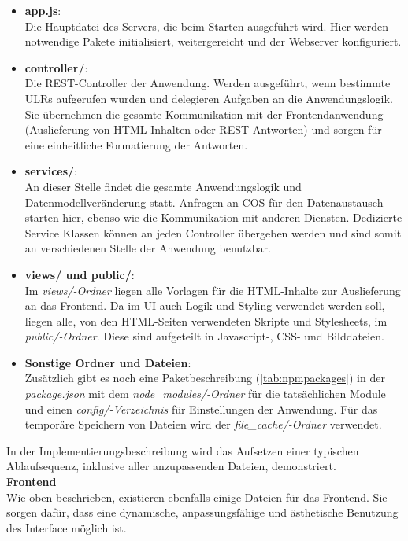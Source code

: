 \begin{itemize}
	\item \textbf{app.js}:\\
	Die Hauptdatei des Servers, die beim Starten ausgeführt wird. Hier werden notwendige Pakete initialisiert, weitergereicht und der Webserver konfiguriert.
	\item \textbf{controller/}:\\
	Die REST-Controller der Anwendung. Werden ausgeführt, wenn bestimmte ULRs aufgerufen wurden und delegieren Aufgaben an die Anwendungslogik. Sie übernehmen die gesamte Kommunikation mit der Frontendanwendung (Auslieferung von HTML-Inhalten oder REST-Antworten) und sorgen für eine einheitliche Formatierung der Antworten.
	\item \textbf{services/}:\\
	An dieser Stelle findet die gesamte Anwendungslogik und Datenmodellveränderung statt. Anfragen an \ac{COS} für den Datenaustausch starten hier, ebenso wie die Kommunikation mit anderen Diensten.
	Dedizierte Service Klassen können an jeden Controller übergeben werden und sind somit an verschiedenen Stelle der Anwendung benutzbar.
	\item \textbf{views/ und public/}:\\
	Im \textit{views/-Ordner} liegen alle Vorlagen für die HTML-Inhalte zur Auslieferung an das Frontend. Da im \ac{UI} auch Logik und Styling verwendet werden soll, liegen alle, von den HTML-Seiten verwendeten Skripte und Stylesheets, im \textit{public/-Ordner}.
	Diese sind aufgeteilt in Javascript-, CSS- und Bilddateien.
	\item \textbf{Sonstige Ordner und Dateien}:\\
	Zusätzlich gibt es noch eine Paketbeschreibung (\autoref{tab:npmpackages}) in der \textit{package.json} mit dem \textit{node\_modules/-Ordner} für die tatsächlichen Module und einen \textit{config/-Verzeichnis} für Einstellungen der Anwendung. Für das temporäre Speichern von Dateien wird der \textit{file\_cache/-Ordner} verwendet.
\end{itemize}

In der Implementierungsbeschreibung wird das Aufsetzen einer typischen Ablaufsequenz, inklusive aller anzupassenden Dateien, demonstriert.\\

\textbf{Frontend}\\
Wie oben beschrieben, existieren ebenfalls einige Dateien für das Frontend. Sie sorgen dafür, dass eine dynamische, anpassungsfähige und ästhetische Benutzung des Interface möglich ist.

